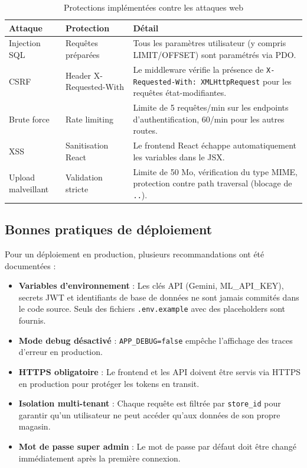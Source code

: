 \documentclass[12pt,a4paper]{report}
\begin{document}
\begin{table}[H]
\centering
\caption{Protections impl\'{e}ment\'{e}es contre les attaques web}
\label{tab:security_protections}
\begin{tabularx}{\textwidth}{l l X}
\toprule
\textbf{Attaque} & \textbf{Protection} & \textbf{D\'{e}tail} \\
\midrule
Injection SQL & Requ\^{e}tes pr\'{e}par\'{e}es & Tous les param\`{e}tres utilisateur (y compris LIMIT/OFFSET) sont param\'{e}tr\'{e}s via PDO. \\
CSRF & Header X-Requested-With & Le middleware v\'{e}rifie la pr\'{e}sence de \texttt{X-Requested-With: XMLHttpRequest} pour les requ\^{e}tes \'{e}tat-modifiantes. \\
Brute force & Rate limiting & Limite de 5 requ\^{e}tes/min sur les endpoints d'authentification, 60/min pour les autres routes. \\
XSS & Sanitisation React & Le frontend React \'{e}chappe automatiquement les variables dans le JSX. \\
Upload malveillant & Validation stricte & Limite de 50 Mo, v\'{e}rification du type MIME, protection contre path traversal (blocage de \texttt{..}). \\
\bottomrule
\end{tabularx}
\end{table}

\subsection{Bonnes pratiques de d\'{e}ploiement}

Pour un d\'{e}ploiement en production, plusieurs recommandations ont \'{e}t\'{e} document\'{e}es :

\begin{itemize}
  \item \textbf{Variables d'environnement} : Les cl\'{e}s API (Gemini, ML\_API\_KEY), secrets JWT et identifiants de base de donn\'{e}es ne sont jamais commit\'{e}s dans le code source. Seuls des fichiers \texttt{.env.example} avec des placeholders sont fournis.
  
  \item \textbf{Mode debug d\'{e}sactiv\'{e}} : \texttt{APP\_DEBUG=false} emp\^{e}che l'affichage des traces d'erreur en production.
  
  \item \textbf{HTTPS obligatoire} : Le frontend et les API doivent \^{e}tre servis via HTTPS en production pour prot\'{e}ger les tokens en transit.
  
  \item \textbf{Isolation multi-tenant} : Chaque requ\^{e}te est filtr\'{e}e par \texttt{store\_id} pour garantir qu'un utilisateur ne peut acc\'{e}der qu'aux donn\'{e}es de son propre magasin.
  
  \item \textbf{Mot de passe super admin} : Le mot de passe par d\'{e}faut doit \^{e}tre chang\'{e} imm\'{e}diatement apr\`{e}s la premi\`{e}re connexion.
\end{itemize}
\end{document}
